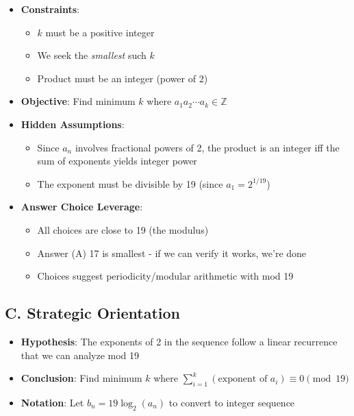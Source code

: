 \documentclass[11pt]{article}
\begin{document}
\begin{problemconfigbox}
\begin{itemize}[leftmargin=*]
    \item \textbf{Constraints}: 
    \begin{itemize}
        \item $k$ must be a positive integer
        \item We seek the \emph{smallest} such $k$
        \item Product must be an integer (power of 2)
    \end{itemize}
    
    \item \textbf{Objective}: Find minimum $k$ where $a_1a_2\cdots a_k \in \mathbb{Z}$
    
    \item \textbf{Hidden Assumptions}: 
    \begin{itemize}
        \item Since $a_n$ involves fractional powers of 2, the product is an integer iff the sum of exponents yields integer power
        \item The exponent must be divisible by 19 (since $a_1 = 2^{1/19}$)
    \end{itemize}
    
    \item \textbf{Answer Choice Leverage}: 
    \begin{itemize}
        \item All choices are close to 19 (the modulus)
        \item Answer (A) 17 is smallest - if we can verify it works, we're done
        \item Choices suggest periodicity/modular arithmetic with mod 19
    \end{itemize}
\end{itemize}

\subsection*{C. Strategic Orientation}
\begin{itemize}[leftmargin=*]
    \item \textbf{Hypothesis}: The exponents of 2 in the sequence follow a linear recurrence that we can analyze mod 19
    
    \item \textbf{Conclusion}: Find minimum $k$ where $\sum_{i=1}^{k} (\text{exponent of } a_i) \equiv 0 \pmod{19}$
    
    \item \textbf{Notation}: Let $b_n = 19\log_2(a_n)$ to convert to integer sequence
    

\end{itemize}
\end{problemconfigbox}
\end{document}

